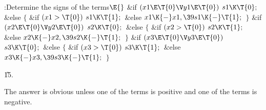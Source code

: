 \B{}:Determine the signs of the terms\X${}\E{}$\6
\&{if} ${}(\\{x1}\E\T{0}\V\\{y1}\E\T{0}){}$\1\5
${}\\{s1}\K\T{0};{}$\2\6
\&{else}\5
${}\{{}$\1\6
\&{if} ${}(\\{x1}>\T{0}){}$\1\5
${}\\{s1}\K\T{1};{}$\2\6
\&{else}\1\5
${}\\{x1}\K{-}\\{x1},\39\\{s1}\K{-}\T{1};{}$\2\6
\4${}\}{}$\2\6
\&{if} ${}(\\{x2}\E\T{0}\V\\{y2}\E\T{0}){}$\1\5
${}\\{s2}\K\T{0};{}$\2\6
\&{else}\5
${}\{{}$\1\6
\&{if} ${}(\\{x2}>\T{0}){}$\1\5
${}\\{s2}\K\T{1};{}$\2\6
\&{else}\1\5
${}\\{x2}\K{-}\\{x2},\39\\{s2}\K{-}\T{1};{}$\2\6
\4${}\}{}$\2\6
\&{if} ${}(\\{x3}\E\T{0}\V\\{y3}\E\T{0}){}$\1\5
${}\\{s3}\K\T{0};{}$\2\6
\&{else}\5
${}\{{}$\1\6
\&{if} ${}(\\{x3}>\T{0}){}$\1\5
${}\\{s3}\K\T{1};{}$\2\6
\&{else}\1\5
${}\\{x3}\K{-}\\{x3},\39\\{s3}\K{-}\T{1};{}$\2\6
\4${}\}{}$\2\par
\U15.\fi

The answer is obvious unless one of the terms is positive and one
of the terms is negative.

